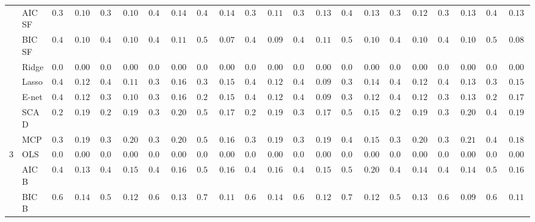 \begin{tabular}{ll|ll|llllll|llllll|llllll}
 & AIC SF  & $0.348$ & $0.1087$ & $0.368$ & $0.1053$ & $0.400$ & $0.1449$ & $0.472$ & $0.1436$ & $0.362$ & $0.1196$ & $0.382$ & $0.1306$ & $0.456$ & $0.1395$ & $0.360$ & $0.1271$ & $0.382$ & $0.1306$ & $0.472$ & $0.1379$ \\
 & BIC SF  & $0.450$ & $0.1000$ & $0.454$ & $0.1058$ & $0.486$ & $0.1146$ & $0.562$ & $0.0789$ & $0.474$ & $0.0970$ & $0.480$ & $0.1101$ & $0.550$ & $0.1000$ & $0.470$ & $0.1078$ & $0.494$ & $0.1081$ & $0.564$ & $0.0871$ \\
 & Ridge  & $0.000$ & $0.0000$ & $0.000$ & $0.0000$ & $0.000$ & $0.0000$ & $0.000$ & $0.0000$ & $0.000$ & $0.0000$ & $0.000$ & $0.0000$ & $0.000$ & $0.0000$ & $0.000$ & $0.0000$ & $0.000$ & $0.0000$ & $0.000$ & $0.0000$ \\
 & Lasso  & $0.480$ & $0.1239$ & $0.418$ & $0.1140$ & $0.370$ & $0.1642$ & $0.378$ & $0.1554$ & $0.460$ & $0.1255$ & $0.440$ & $0.0985$ & $0.386$ & $0.1457$ & $0.466$ & $0.1273$ & $0.426$ & $0.1383$ & $0.388$ & $0.1578$ \\
 & E-net  & $0.456$ & $0.1242$ & $0.396$ & $0.1063$ & $0.338$ & $0.1625$ & $0.282$ & $0.1533$ & $0.452$ & $0.1259$ & $0.434$ & $0.0945$ & $0.310$ & $0.1251$ & $0.448$ & $0.1210$ & $0.394$ & $0.1377$ & $0.276$ & $0.1793$ \\
 & SCAD  & $0.266$ & $0.1950$ & $0.284$ & $0.1994$ & $0.346$ & $0.2086$ & $0.500$ & $0.1741$ & $0.294$ & $0.1958$ & $0.336$ & $0.1773$ & $0.502$ & $0.1595$ & $0.294$ & $0.1979$ & $0.322$ & $0.2008$ & $0.482$ & $0.1930$ \\
 & MCP  & $0.306$ & $0.1999$ & $0.328$ & $0.2021$ & $0.376$ & $0.2036$ & $0.508$ & $0.1643$ & $0.324$ & $0.1985$ & $0.376$ & $0.1975$ & $0.486$ & $0.1589$ & $0.334$ & $0.2071$ & $0.358$ & $0.2189$ & $0.496$ & $0.1809$ \\\hline
3 & OLS  & $0.000$ & $0.0000$ & $0.000$ & $0.0000$ & $0.000$ & $0.0000$ & $0.000$ & $0.0000$ & $0.000$ & $0.0000$ & $0.000$ & $0.0000$ & $0.000$ & $0.0000$ & $0.000$ & $0.0000$ & $0.000$ & $0.0000$ & $0.000$ & $0.0000$ \\
 & AIC B  & $0.428$ & $0.1364$ & $0.452$ & $0.1521$ & $0.480$ & $0.1633$ & $0.588$ & $0.1677$ & $0.412$ & $0.1653$ & $0.464$ & $0.1554$ & $0.580$ & $0.2020$ & $0.432$ & $0.1497$ & $0.474$ & $0.1468$ & $0.562$ & $0.1698$ \\
 & BIC B  & $0.608$ & $0.1447$ & $0.586$ & $0.1279$ & $0.628$ & $0.1393$ & $0.708$ & $0.1152$ & $0.626$ & $0.1411$ & $0.642$ & $0.1281$ & $0.720$ & $0.1239$ & $0.596$ & $0.1333$ & $0.622$ & $0.0980$ & $0.656$ & $0.1104$ \\

\end{tabular}
